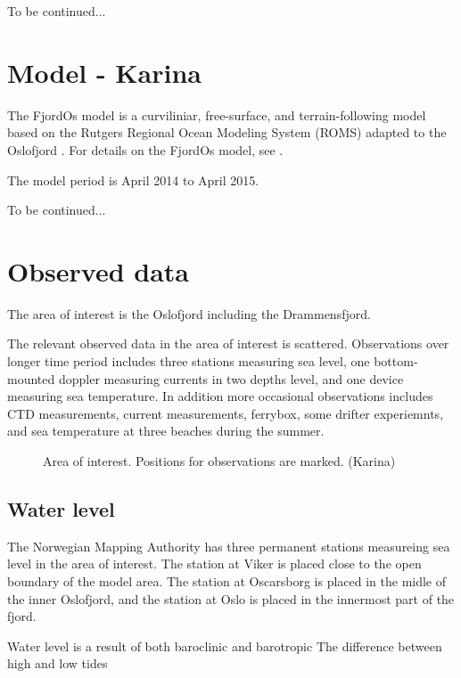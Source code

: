 \documentclass[12pt,a4paper,english]{article}
\begin{document}
To be continued...


\section{Model - Karina}
The FjordOs model is a curviliniar, free-surface, and terrain-following model based on the Rutgers Regional Ocean Modeling System (ROMS) \citep{haidv:etal:2008,shche:mcwil:2003,shche:mcwil:2005,shche:mcwil:2009} adapted to the Oslofjord \citep{roed:etal:2016}. For details on the FjordOs model, see \cite{roed:etal:2016}.

The model period is April 2014 to April 2015.



To be continued...


\section{Observed data}

The area of interest is the Oslofjord including the Drammensfjord.

The relevant observed data in the area of interest is scattered. Observations over longer time period includes three stations measuring sea level, one bottom-mounted doppler measuring currents in two depths level, and one device measuring sea temperature. In addition more occasional observations includes CTD measurements, current measurements, ferrybox, some drifter experiemnts, and sea temperature at three beaches during the summer.  

\begin{figure}[t]
\centerline{
}
\caption{\small
Area of interest. Positions for observations are marked. (Karina)
}
\label{fig:kart}
\end{figure}


\subsection{Water level}
The Norwegian Mapping Authority has three permanent stations measureing sea level in the area of interest. The station at Viker is placed close to the open boundary of the model area. The station at Oscarsborg is placed in the midle of the inner Oslofjord, and the station at Oslo is placed in the innermost part of the fjord.

Water level is a result of both baroclinic and barotropic The difference between high and low tides 
\end{document}
